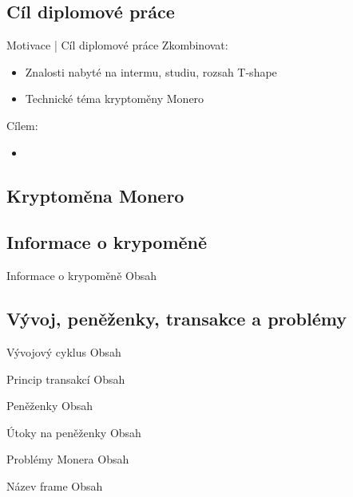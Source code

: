 \documentclass{beamer}
\begin{document}
\begin{darkframes}
    \subsection{Cíl diplomové práce}
    \begin{frame}{Motivace | Cíl diplomové práce}
     Zkombinovat:
     \begin{itemize}
     \item Znalosti nabyté na intermu, studiu, rozsah T-shape
     \item Technické téma kryptoměny Monero
     \end{itemize}
     	Cílem:
		\begin{itemize}
		\item 
		\end{itemize}
    \end{frame}
  \end{darkframes}

    
  \begin{darkframes}
    \section{Kryptoměna Monero}
    \subsection{Informace o krypoměně}
    \begin{frame}{Informace o krypoměně}
     Obsah
    \end{frame}
    \subsection{Vývoj, peněženky, transakce a problémy}
    \begin{frame}{Vývojový cyklus}
     Obsah
    \end{frame}
    \begin{frame}{Princip transakcí}
     Obsah
    \end{frame}
    \begin{frame}{Peněženky}
     Obsah
    \end{frame}
    \begin{frame}{Útoky na peněženky}
     Obsah
    \end{frame}
    \begin{frame}{Problémy Monera}
     Obsah
    \end{frame}
    \begin{frame}{Název frame}
     Obsah
    \end{frame}
  \end{darkframes}
\end{document}
